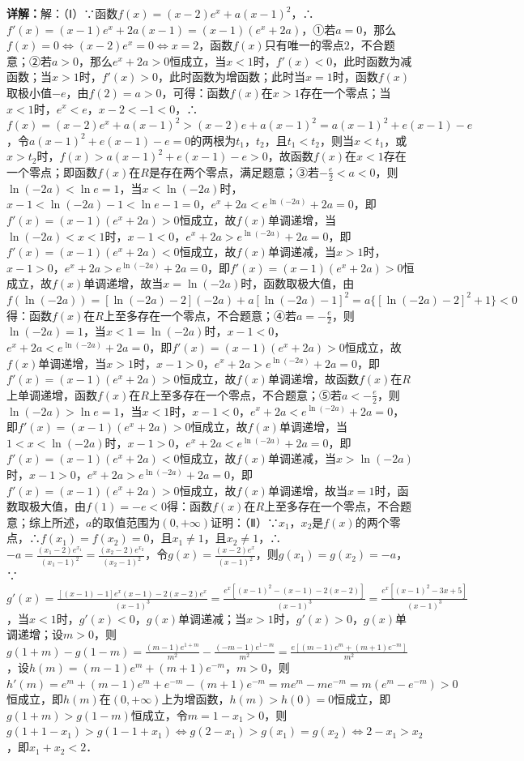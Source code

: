 \begin{question}[points=12]
\begin{solution}
\textbf{详解：}解：（Ⅰ）∵函数$f(x)=(x-2)e^x+a(x-1)^2$，∴$f'(x)=(x-1)e^x+2a(x-1)=(x-1)(e^x+2a)$，①若$a=0$，那么$f(x)=0\Leftrightarrow(x-2)e^x=0\Leftrightarrow x=2$，函数$f(x)$只有唯一的零点$2$，不合题意；②若$a>0$，那么$e^x+2a>0$恒成立，当$x<1$时，$f'(x)<0$，此时函数为减函数；当$x>1$时，$f'(x)>0$，此时函数为增函数；此时当$x=1$时，函数$f(x)$取极小值$-e$，由$f(2)=a>0$，可得：函数$f(x)$在$x>1$存在一个零点；当$x<1$时，$e^x<e$，$x-2<-1<0$，∴$f(x)=(x-2)e^x+a(x-1)^2>(x-2)e+a(x-1)^2=a(x-1)^2+e(x-1)-e$，令$a(x-1)^2+e(x-1)-e=0$的两根为$t_1$，$t_2$，且$t_1<t_2$，则当$x<t_1$，或$x>t_2$时，$f(x)>a(x-1)^2+e(x-1)-e>0$，故函数$f(x)$在$x<1$存在一个零点；即函数$f(x)$在$R$是存在两个零点，满足题意；③若$-\frac{e}{2}<a<0$，则$\ln(-2a)<\ln e=1$，当$x<\ln(-2a)$时，$x-1<\ln(-2a)-1<\ln e-1=0$，$e^x+2a<e^{\ln(-2a)}+2a=0$，即$f'(x)=(x-1)(e^x+2a)>0$恒成立，故$f(x)$单调递增，当$\ln(-2a)<x<1$时，$x-1<0$，$e^x+2a>e^{\ln(-2a)}+2a=0$，即$f'(x)=(x-1)(e^x+2a)<0$恒成立，故$f(x)$单调递减，当$x>1$时，$x-1>0$，$e^x+2a>e^{\ln(-2a)}+2a=0$，即$f'(x)=(x-1)(e^x+2a)>0$恒成立，故$f(x)$单调递增，故当$x=\ln(-2a)$时，函数取极大值，由$f(\ln(-2a))=[\ln(-2a)-2](-2a)+a[\ln(-2a)-1]^2=a\{[\ln(-2a)-2]^2+1\}<0$得：函数$f(x)$在$R$上至多存在一个零点，不合题意；④若$a=-\frac{e}{2}$，则$\ln(-2a)=1$，当$x<1=\ln(-2a)$时，$x-1<0$，$e^x+2a<e^{\ln(-2a)}+2a=0$，即$f'(x)=(x-1)(e^x+2a)>0$恒成立，故$f(x)$单调递增，当$x>1$时，$x-1>0$，$e^x+2a>e^{\ln(-2a)}+2a=0$，即$f'(x)=(x-1)(e^x+2a)>0$恒成立，故$f(x)$单调递增，故函数$f(x)$在$R$上单调递增，函数$f(x)$在$R$上至多存在一个零点，不合题意；⑤若$a<-\frac{e}{2}$，则$\ln(-2a)>\ln e=1$，当$x<1$时，$x-1<0$，$e^x+2a<e^{\ln(-2a)}+2a=0$，即$f'(x)=(x-1)(e^x+2a)>0$恒成立，故$f(x)$单调递增，当$1<x<\ln(-2a)$时，$x-1>0$，$e^x+2a<e^{\ln(-2a)}+2a=0$，即$f'(x)=(x-1)(e^x+2a)<0$恒成立，故$f(x)$单调递减，当$x>\ln(-2a)$时，$x-1>0$，$e^x+2a>e^{\ln(-2a)}+2a=0$，即$f'(x)=(x-1)(e^x+2a)>0$恒成立，故$f(x)$单调递增，故当$x=1$时，函数取极大值，由$f(1)=-e<0$得：函数$f(x)$在$R$上至多存在一个零点，不合题意；综上所述，$a$的取值范围为$(0,+\infty)$证明：（Ⅱ）∵$x_1$，$x_2$是$f(x)$的两个零点，∴$f(x_1)=f(x_2)=0$，且$x_1\neq1$，且$x_2\neq1$，∴$-a=\frac{(x_1-2)e^{x_1}}{(x_1-1)^2}=\frac{(x_2-2)e^{x_2}}{(x_2-1)^2}$，令$g(x)=\frac{(x-2)e^x}{(x-1)^2}$，则$g(x_1)=g(x_2)=-a$，∵$g'(x)=\frac{[(x-1)-1]e^x(x-1)-2(x-2)e^x}{(x-1)^3}=\frac{e^x[(x-1)^2- (x-1)-2(x-2)]}{(x-1)^3}=\frac{e^x[(x-1)^2-3x+5]}{(x-1)^3}$，当$x<1$时，$g'(x)<0$，$g(x)$单调递减；当$x>1$时，$g'(x)>0$，$g(x)$单调递增；设$m>0$，则$g(1+m)-g(1-m)=\frac{(m-1)e^{1+m}}{m^2}-\frac{(-m-1)e^{1-m}}{m^2}=\frac{e[(m-1)e^m+(m+1)e^{-m}]}{m^2}$，设$h(m)= (m-1)e^m+(m+1)e^{-m}$，$m>0$，则$h'(m)= e^m+(m-1)e^m + e^{-m}-(m+1)e^{-m}= me^m - me^{-m}= m(e^m - e^{-m})>0$恒成立，即$h(m)$在$(0,+\infty)$上为增函数，$h(m)>h(0)=0$恒成立，即$g(1+m)>g(1-m)$恒成立，令$m=1-x_1>0$，则$g(1+1-x_1)>g(1-1+x_1)\Leftrightarrow g(2-x_1)>g(x_1)=g(x_2)\Leftrightarrow 2-x_1>x_2$，即$x_1+x_2<2$．
\end{solution}
\end{question}

